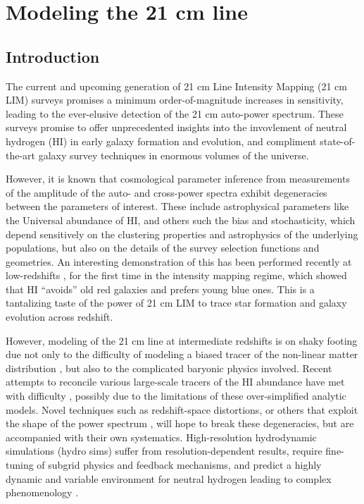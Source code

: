 \chapter{\label{chap:signal} Modeling the 21 cm line}

\newpage

\section{Introduction}
\label{ch:signal:sec:intro}

The current and upcoming generation of 21 cm Line Intensity Mapping (21 cm LIM) surveys promises a minimum order-of-magnitude increases in sensitivity, leading to the ever-elusive detection of the 21 cm auto-power spectrum. These surveys promise to offer unprecedented insights into the invovlement of neutral hydrogen (HI) in early galaxy formation and evolution, and compliment state-of-the-art galaxy survey techniques in enormous volumes of the universe.

However, it is known that cosmological parameter inference from measurements of the amplitude of the auto- and cross-power spectra exhibit degeneracies between the parameters of interest. These include astrophysical parameters like the Universal abundance of HI, and others such the bias and stochasticity, which depend sensitively on the clustering properties and astrophysics of the underlying populations, but also on the details of the survey selection functions and geometries. An interesting demonstration of this has been performed recently at low-redshifts \citep{andersonetalparkes}, for the first time in the intensity mapping regime, which showed that HI ``avoids'' old red galaxies and prefers young blue ones. This is a tantalizing taste of the power of 21 cm LIM to trace star formation and galaxy evolution across redshift.

However, modeling of the 21 cm line at intermediate redshifts is on shaky footing due not only to the difficulty of modeling a biased tracer of the non-linear matter distribution \citep{biasreview}, but also to the complicated baryonic physics involved. Recent attempts to reconcile various large-scale tracers of the HI abundance have met with difficulty \citep{pad2015, castorina2016}, possibly due to the limitations of these over-simplified analytic models. Novel techniques such as redshift-space distortions, or others that exploit the shape of the power spectrum \citep{wolz2017}, will hope to break these degeneracies, but are accompanied with their own systematics. High-resolution hydrodynamic simulations (hydro sims) suffer from resolution-dependent results, require fine-tuning of subgrid physics and feedback mechanisms, and predict a highly dynamic and variable environment for neutral hydrogen \cite{firehi} leading to complex phenomenology \citep{illustristng21cm}.

